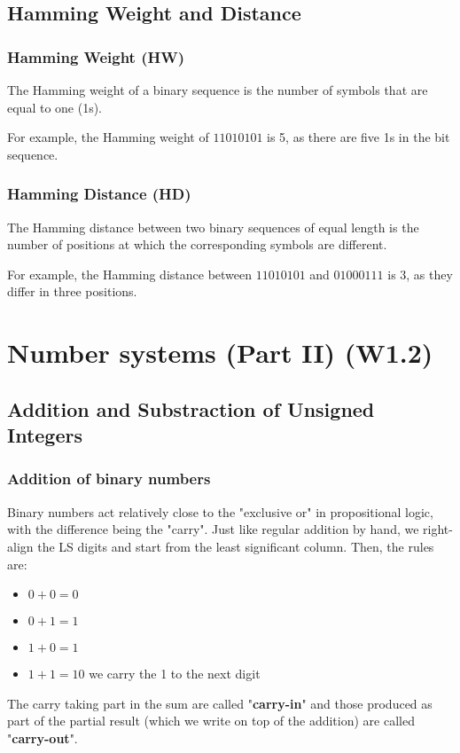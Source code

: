 \documentclass[10pt,a4paper]{book}
\begin{document}
\section{Hamming Weight and Distance}
\subsection{Hamming Weight (HW)}
The Hamming weight of a binary sequence is the number of symbols that are equal to one (1s).\par 
For example, the Hamming weight of $11010101$ is 5, as there are five 1s in the bit sequence.
	
\subsection{Hamming Distance (HD)}
The Hamming distance between two binary sequences of equal length is the number of positions at which the corresponding symbols are different.\par
For example, the Hamming distance between $11010101$ and $01000111$ is 3, as they differ in three positions.


\chapter{Number systems (Part II) (W1.2)}
\section{Addition and Substraction of Unsigned Integers}

\subsection{Addition of binary numbers}
Binary numbers act relatively close to the "exclusive or" in propositional logic, with the difference being the "carry". Just like regular addition by hand, we right-align the LS digits and start from the least significant column. Then, the rules are:
\begin{itemize}
\item $0+0=0$
\item $0+1=1$
\item $1+0=1$
\item $1+1=10$ we carry the 1 to the next digit
\end{itemize}
The carry taking part in the sum are called "\textbf{carry-in}" and those produced as part of the partial result (which we write on top of the addition) are called "\textbf{carry-out}".
\end{document}
